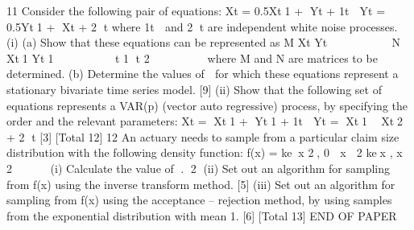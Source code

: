 11 Consider the following pair of equations:
  Xt = 0.5Xt1 + Yt + 1t
  
  Yt = 0.5Yt1 + Xt + 2
  t
  where 1t
   and 2
  t are independent white noise processes.
  (i) (a) Show that these equations can be represented as
  M
  Xt
  Yt
  
  
  
  
  
  
   N
  Xt1
  Yt1
  
  
  
  
  
  
  
  t
  1
  t
  2
  
  
  
  
  
  
  where M and N are matrices to be determined.
  (b) Determine the values of  for which these equations represent a
  stationary bivariate time series model. [9]
  (ii) Show that the following set of equations represents a VAR(p) (vector auto
                                                                     regressive) process, by specifying the order and the relevant parameters:
    Xt = Xt1 + Yt1 + 1t
  
  Yt = Xt1  Xt2 + 2
  t
  [3]
  [Total 12]
  12 An actuary needs to sample from a particular claim size distribution with the
  following density function:
    f(x) = kex 2, 0  x  2
  kex , x  2
  
   
   
  (i) Calculate the value of 􀝇. 􁈾2􁈿
  (ii) Set out an algorithm for sampling from f(x) using the inverse transform
  method. [5]
  (iii) Set out an algorithm for sampling from f(x) using the acceptance – rejection
  method, by using samples from the exponential distribution with mean 1. [6]
  [Total 13]
  END OF PAPER
  
